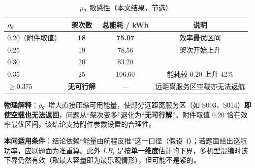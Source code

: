 \begin{table}[htbp]
	\caption{$\rho_{g}$ 敏感性（本文结果，节选）}
	\label{tab:q1rho}
	\centering
	\begin{tabular}{lccc}
		\toprule
		$\rho_{g}$ & 架次数 & 总能耗 / kWh & 说明 \\
		\midrule
		0.20（附件取值） & \textbf{18} & \textbf{75.07}  & 效率最优区间 \\
		0.25             & 19          & 78.56           & 架次开始上升 \\
		0.30             & 20          & 83.20           & \\
		0.35             & 25          & 106.60          & 能耗较 0.20 上升 42\% \\
		$\ge0.375$       & \textbf{无可行解} & ---        & 远距离服务区空载亦无法返航 \\
		\bottomrule
	\end{tabular}
\end{table}

\textbf{物理解释}：$\rho_{g}$ 增大直接压缩可用能量，使部分远距离服务区（如 S003、S014）\textbf{即使空载也无法返回}，问题从“架次变多”退化为“\textbf{无可行解}”。附件取值 0.20 恰在效率最优区间，该结论支持附件参数设置的合理性。

\textbf{本问适用条件}：结论依赖“能量由航程反推”这一口径（假设 4）；若题面给出巡航功率，应以题面为准重算。此外 $LB_i$ 是按\textbf{单一维度}估计的下界，多机型混编时该下界仍然有效（取最大容量即为最乐观情形），但可能不是紧的。
